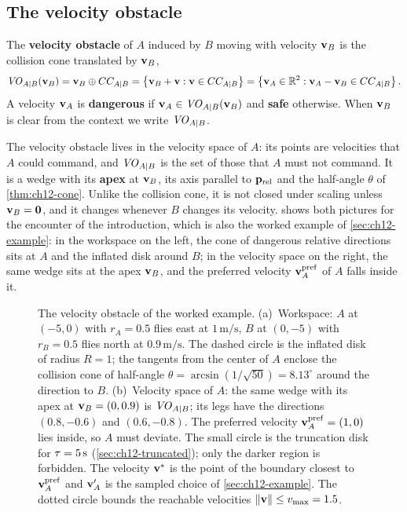 \subsection{The velocity obstacle}

\begin{definition}
\label{def:ch12-vo}
The \textbf{velocity obstacle} of $A$ induced
by $B$ moving with velocity $\mathbf{v}_B$ is the collision cone translated by
$\mathbf{v}_B$,
\begin{equation}
  \mathit{VO}_{A|B}(\mathbf{v}_B) = \mathbf{v}_B \oplus CC_{A|B}
  = \left\{ \mathbf{v}_B + \mathbf{v} : \mathbf{v} \in CC_{A|B} \right\}
  = \left\{ \mathbf{v}_A \in \mathbb{R}^2 : \mathbf{v}_A - \mathbf{v}_B \in CC_{A|B} \right\} .
  \label{eq:ch12-vo}
\end{equation}
A velocity $\mathbf{v}_A$ is \textbf{dangerous} if $\mathbf{v}_A \in \mathit{VO}_{A|B}(\mathbf{v}_B)$
and \textbf{safe} otherwise. When $\mathbf{v}_B$ is clear from the context we write
$\mathit{VO}_{A|B}$.
\end{definition}

The velocity obstacle lives in the velocity space of $A$: its points are
velocities that $A$ could command, and $\mathit{VO}_{A|B}$ is the set of those that
$A$ must not command. It is a wedge with its \textbf{apex} at $\mathbf{v}_B$, its axis parallel to $\mathbf{p}_{\mathrm{rel}}$ and the
half-angle $\theta$ of \cref{thm:ch12-cone}. Unlike the collision cone, it is
not closed under scaling unless $\mathbf{v}_B = \mathbf{0}$, and it changes whenever
$B$ changes its velocity.  shows both pictures for the
encounter of the introduction, which is also the worked example of
\cref{sec:ch12-example}: in the workspace on the left, the cone of dangerous
relative directions sits at $A$ and the inflated disk around $B$; in the
velocity space on the right, the same wedge sits at the apex $\mathbf{v}_B$, and the
preferred velocity $\mathbf{v}_A^{\mathrm{pref}}$ of $A$ falls inside it.

\begin{figure}[tb]
  \centering
  \caption{The velocity obstacle of the worked example. (a)~Workspace: $A$ at
  $(-5,0)$ with $r_A=0.5$ flies east at $1\,\mathrm{m/s}$, $B$ at $(0,-5)$
  with $r_B=0.5$ flies north at $0.9\,\mathrm{m/s}$. The dashed circle is the
  inflated disk of radius $R=1$; the tangents from the center of $A$ enclose
  the collision cone of half-angle $\theta = \arcsin(1/\sqrt{50}) = 8.13^\circ$
  around the direction to $B$. (b)~Velocity space of $A$: the same wedge with
  its apex at $\mathbf{v}_B=(0,0.9)$ is $\mathit{VO}_{A|B}$; its legs have the directions
  $(0.8,-0.6)$ and $(0.6,-0.8)$. The preferred velocity
  $\mathbf{v}_A^{\mathrm{pref}}=(1,0)$ lies inside, so $A$ must deviate. The small
  circle is the truncation disk for $\tau=5\,\mathrm{s}$
  (\cref{sec:ch12-truncated}); only the darker region is forbidden. The
  velocity $\mathbf{v}^*$ is the point of the boundary closest to
  $\mathbf{v}_A^{\mathrm{pref}}$ and $\mathbf{v}_A'$ is the sampled choice of
  \cref{sec:ch12-example}. The dotted circle bounds the reachable velocities
  $\left\lVert \mathbf{v} \right\rVert\le v_{\max}=1.5$.}
  \label{fig:ch12-geometry}
\end{figure}

